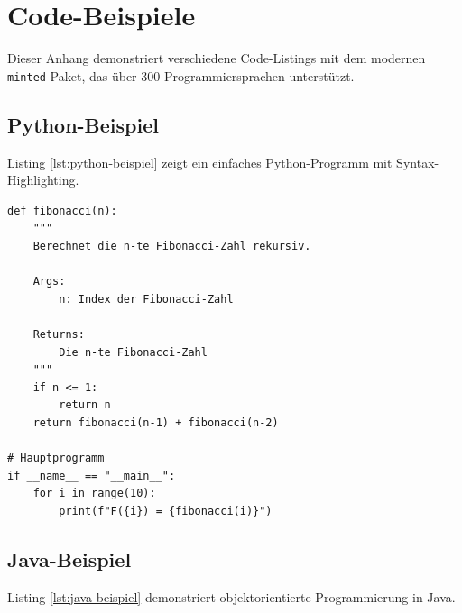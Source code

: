 
\chapter{Code-Beispiele}
\label{chap:code-beispiele}


Dieser Anhang demonstriert verschiedene Code-Listings mit dem modernen \texttt{minted}-Paket, das über 300 Programmiersprachen unterstützt.

\section{Python-Beispiel}
\label{sec:python-code}

Listing \ref{lst:python-beispiel} zeigt ein einfaches Python-Programm mit Syntax-Highlighting.

\begin{listing}[htbp]
\begin{verbatim}
def fibonacci(n):
    """
    Berechnet die n-te Fibonacci-Zahl rekursiv.
    
    Args:
        n: Index der Fibonacci-Zahl
        
    Returns:
        Die n-te Fibonacci-Zahl
    """
    if n <= 1:
        return n
    return fibonacci(n-1) + fibonacci(n-2)

# Hauptprogramm
if __name__ == "__main__":
    for i in range(10):
        print(f"F({i}) = {fibonacci(i)}")
\end{verbatim}
\caption{Python-Implementierung der Fibonacci-Funktion}
\label{lst:python-beispiel}
\end{listing}

\section{Java-Beispiel}
\label{sec:java-code}

Listing \ref{lst:java-beispiel} demonstriert objektorientierte Programmierung in Java.

